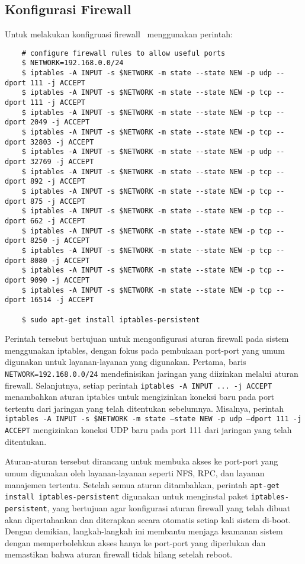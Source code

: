 \subsection{Konfigurasi Firewall}
Untuk melakukan konfigruasi firewall \saya\ menggunakan perintah:

\begin{listing}[H]
    \begin{verbatim}       
    # configure firewall rules to allow useful ports
    $ NETWORK=192.168.0.0/24
    $ iptables -A INPUT -s $NETWORK -m state --state NEW -p udp --dport 111 -j ACCEPT
    $ iptables -A INPUT -s $NETWORK -m state --state NEW -p tcp --dport 111 -j ACCEPT
    $ iptables -A INPUT -s $NETWORK -m state --state NEW -p tcp --dport 2049 -j ACCEPT
    $ iptables -A INPUT -s $NETWORK -m state --state NEW -p tcp --dport 32803 -j ACCEPT
    $ iptables -A INPUT -s $NETWORK -m state --state NEW -p udp --dport 32769 -j ACCEPT
    $ iptables -A INPUT -s $NETWORK -m state --state NEW -p tcp --dport 892 -j ACCEPT
    $ iptables -A INPUT -s $NETWORK -m state --state NEW -p tcp --dport 875 -j ACCEPT
    $ iptables -A INPUT -s $NETWORK -m state --state NEW -p tcp --dport 662 -j ACCEPT
    $ iptables -A INPUT -s $NETWORK -m state --state NEW -p tcp --dport 8250 -j ACCEPT
    $ iptables -A INPUT -s $NETWORK -m state --state NEW -p tcp --dport 8080 -j ACCEPT
    $ iptables -A INPUT -s $NETWORK -m state --state NEW -p tcp --dport 9090 -j ACCEPT
    $ iptables -A INPUT -s $NETWORK -m state --state NEW -p tcp --dport 16514 -j ACCEPT
    
    $ sudo apt-get install iptables-persistent
    \end{verbatim}
\end{listing}

Perintah tersebut bertujuan untuk mengonfigurasi aturan firewall pada sistem menggunakan iptables, dengan fokus pada pembukaan port-port yang umum digunakan untuk layanan-layanan yang digunakan. Pertama, baris \texttt{NETWORK=192.168.0.0/24} mendefinisikan jaringan yang diizinkan melalui aturan firewall. Selanjutnya, setiap perintah \texttt{iptables -A INPUT ... -j ACCEPT} menambahkan aturan iptables untuk mengizinkan koneksi baru pada port tertentu dari jaringan yang telah ditentukan sebelumnya. Misalnya, perintah \texttt{iptables -A INPUT -s \$NETWORK -m state --state NEW -p udp --dport 111 -j ACCEPT} mengizinkan koneksi UDP baru pada port 111 dari jaringan yang telah ditentukan.

Aturan-aturan tersebut dirancang untuk membuka akses ke port-port yang umum digunakan oleh layanan-layanan seperti NFS, RPC, dan layanan manajemen tertentu. Setelah semua aturan ditambahkan, perintah \texttt{apt-get install iptables-persistent} digunakan untuk menginstal paket \texttt{iptables-persistent}, yang bertujuan agar konfigurasi aturan firewall yang telah dibuat akan dipertahankan dan diterapkan secara otomatis setiap kali sistem di-boot. Dengan demikian, langkah-langkah ini membantu menjaga keamanan sistem dengan memperbolehkan akses hanya ke port-port yang diperlukan dan memastikan bahwa aturan firewall tidak hilang setelah reboot.


